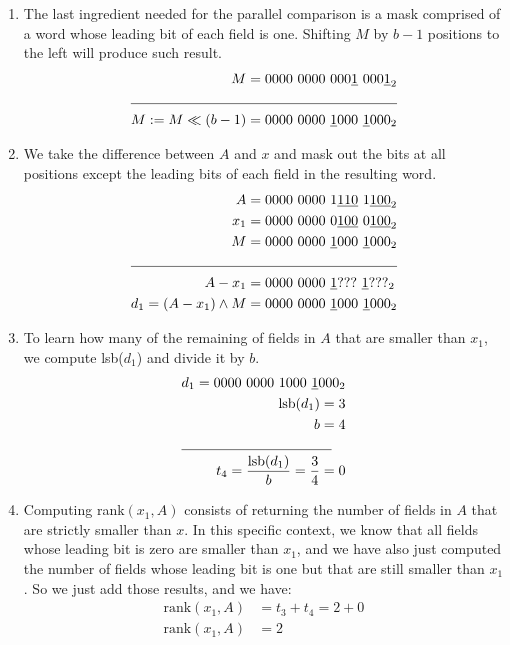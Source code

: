 \begin{itemize}
\begin{enumerate}
        \item
        The last ingredient needed for the parallel comparison is a mask comprised of a word whose leading bit of each field is one. Shifting $M$ by $b - 1$ positions to the left will produce such result.
        \begin{align*}
            M = 0000\ 0000\ 000\underline{1}\ 000\underline{1}_2& \\
            \cline{1-2}
            M := M \ll (b - 1) = 0000\ 0000\ \underline{1}000\ \underline{1}000_2& \\
        \end{align*}
        
        \item
        We take the difference between $A$ and $x$ and mask out the bits at all positions except the leading bits of each field in the resulting word.
        \begin{align*}
            A &= 0000\ 0000\ 1\underline{110}\ 1\underline{100}_2 \\
            x_1 &= 0000\ 0000\ 0\underline{100}\ 0\underline{100}_2 \\
            M &= 0000\ 0000\ \underline{1}000\ \underline{1}000_2 \\
            \cline{1-2}
            A - x_1 &= 0000\ 0000\ \underline{1}???\ \underline{1}???_2 \\
            d_1 = (A - x_1) \wedge M &= 0000\ 0000\ \underline{1}000\ \underline{1}000_2 \\
        \end{align*}
        
        \item
        To learn how many of the remaining of fields in $A$ that are smaller than $x_1$, we compute lsb($d_1$) and divide it by $b$.
        \begin{align*}
            d_1 = 0000\ 0000\ 1000\ \underline{1}000_2 \\
            \text{lsb}(d_1) = 3 \\
            b = 4 \\
            \cline{1-2}
            t_4 = \frac{\text{lsb}(d_1)}{b} = \frac{3}{4} = 0 
        \end{align*}
        
        \item
        Computing rank$(x_1, A)$ consists of returning the number of fields in $A$ that are strictly smaller than $x$. In this specific context, we know that all fields whose leading bit is zero are smaller than $x_1$, and we have also just computed the number of fields whose leading bit is one but that are still smaller than $x_1$. So we just add those results, and we have:
        \begin{align*}
            \text{rank}(x_1, A) &= t_3 + t_4 = 2 + 0 \\
            \text{rank}(x_1, A) &= 2
        \end{align*}
        

\end{enumerate}
\end{itemize}
